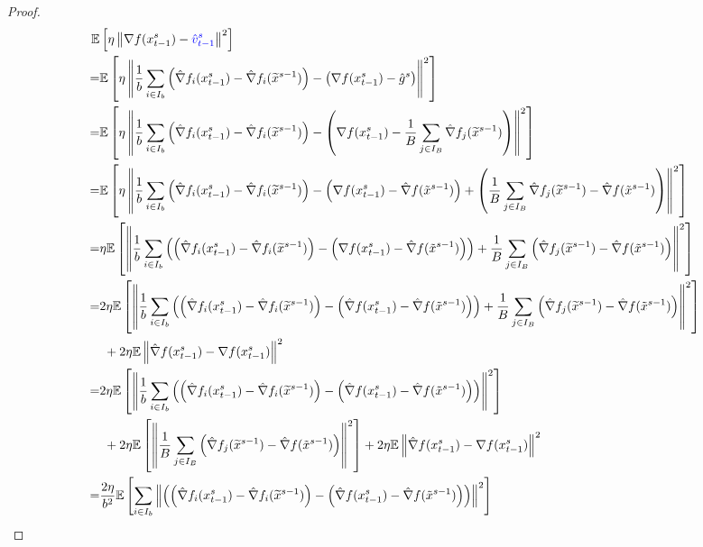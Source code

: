 \documentclass{article}
\newcommand*{\E}{\mathbb{E}}
\newcommand{\norm}[1]{\left\lVert#1\right\rVert}
\theoremstyle{definition}
\theoremstyle{remark}
\begin{document}
\begin{proof}
{\color{blue}
 \begin{align}
  \E&\left[\eta\norm{\nabla f(x_{t-1}^s)-{\color{blue}\hat{v}_{t-1}^s}}^2\right]\notag\\
   =&\E\left[\eta\norm{\frac{1}{b}\sum_{i\in I_b}\left(\hat{\nabla} f_i(x_{t-1}^s)-\hat{\nabla} f_i(\widetilde{x}^{s-1})\right) - \left(\nabla f(x_{t-1}^s)-\hat{g}^s\right)}^2\right]\notag\\
   =&\E\left[\eta\norm{\frac{1}{b}\sum_{i\in I_b}\left(\hat{\nabla} f_i(x_{t-1}^s)-\hat{\nabla} f_i(\widetilde{x}^{s-1})\right) - \left(\nabla f(x_{t-1}^s)-\frac{1}{B}\sum_{j\in I_B}\hat{\nabla} f_j(\widetilde{x}^{s-1})\right)}^2\right]\notag\\
   =&\notag\E\left[\eta\norm{\frac{1}{b}\sum_{i\in I_b}\left(\hat{\nabla} f_i(x_{t-1}^s)-\hat{\nabla} f_i(\widetilde{x}^{s-1})\right) - \left(\nabla f(x_{t-1}^s) - \hat{\nabla} f(\tilde{x}^{s-1}) \right)+ \left(\frac{1}{B}\sum_{j\in I_B}\hat{\nabla} f_j(\widetilde{x}^{s-1}) - \hat{\nabla} f(\tilde{x}^{s-1})\right)}^2\right]\\
   =&\notag\eta\E\left[\norm{\frac{1}{b}\sum_{i\in I_b}\left(\left(\hat{\nabla} f_i(x_{t-1}^s)-\hat{\nabla} f_i(\widetilde{x}^{s-1})\right) - \left(\nabla f(x_{t-1}^s) - \hat{\nabla} f(\tilde{x}^{s-1}) \right)\right)+ \frac{1}{B}\sum_{j\in I_B}\left(\hat{\nabla} f_j(\widetilde{x}^{s-1}) - \hat{\nabla} f(\tilde{x}^{s-1})\right)}^2\right]\\
   =&\notag2\eta\E\left[\norm{\frac{1}{b}\sum_{i\in I_b}\left(\left(\hat{\nabla} f_i(x_{t-1}^s)-\hat{\nabla} f_i(\widetilde{x}^{s-1})\right) - \left(\hat{\nabla} f(x_{t-1}^s) - \hat{\nabla} f(\tilde{x}^{s-1}) \right)\right)+ \frac{1}{B}\sum_{j\in I_B}\left(\hat{\nabla} f_j(\widetilde{x}^{s-1}) - \hat{\nabla} f(\tilde{x}^{s-1})\right)}^2\right]\\
   &\,\, + 2\eta \E \norm{\hat{\nabla} f(x_{t-1}^s)-\nabla f(x_{t-1}^s)}^2\\
    = &\notag 2 \eta\E\left[\norm{\frac{1}{b}\sum_{i\in I_b}\left(\left(\hat{\nabla} f_i(x_{t-1}^s)-\hat{\nabla} f_i(\widetilde{x}^{s-1})\right) - \left(\hat{\nabla} f(x_{t-1}^s) - \hat{\nabla} f(\tilde{x}^{s-1}) \right)\right)}^2\right]\\
   &\,\, +2 \eta \E \left[ \norm{\frac{1}{B}\sum_{j\in I_B}\left(\hat{\nabla} f_j(\widetilde{x}^{s-1}) - \hat{\nabla} f(\tilde{x}^{s-1})\right)}^2\right]+ 2\eta \E \norm{\hat{\nabla} f(x_{t-1}^s)-\nabla f(x_{t-1}^s)}^2\label{eq26}\\
   = &\notag\frac{2\eta}{b^2}\E\left[\sum_{i\in I_b}\norm{\left(\left(\hat{\nabla} f_i(x_{t-1}^s)-\hat{\nabla} f_i(\widetilde{x}^{s-1})\right) - \left({\hat{\nabla}} f(x_{t-1}^s) - \hat{\nabla} f(\tilde{x}^{s-1}) \right)\right)}^2\right]\\

\end{align}}
\end{proof}
\end{document}
